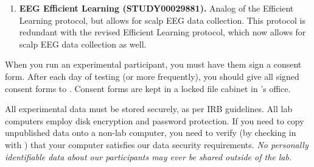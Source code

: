 \documentclass{tufte-book} %
\begin{document}
 \begin{enumerate}
 \item \textbf{EEG Efficient Learning (STUDY00029881).} Analog of the
   Efficient Learning protocol, but allows for scalp EEG data
   collection.  This protocol is redundant with the revised
   Efficient Learning protocol, which now allows for scalp EEG data
   collection as well.
   \end{enumerate}

   
\noindent
   When you run an experimental participant, you must have them sign a
   consent form.  After each day of testing (or more frequently), you
   should give all signed consent forms to \coordinator.  Consent
   forms are kept in a locked file cabinet in \director's office.

   All experimental data must be stored securely, as per IRB
   guidelines.  All lab computers employ disk encryption and password
   protection.  If you need to copy unpublished data onto a non-lab
   computer, you need to verify (by checking in with \director) that
   your computer satisfies our data security requirements.  \textit{No
     personally identifiable data about our participants may ever be
     shared outside of the lab.}
\end{document}
